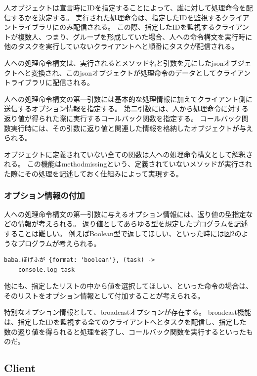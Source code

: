 人オブジェクトは宣言時にIDを指定することによって、誰に対して処理命令を配信するかを決定する。
実行された処理命令は、指定したIDを監視するクライアントライブラリにのみ配信される。
この際、指定したIDを監視するクライアントが複数人、つまり、グループを形成していた場合、人への命令構文を実行時に他のタスクを実行していないクライアントへと順番にタスクが配信される。

人への処理命令構文は、実行されるとメソッド名と引数を元にしたjsonオブジェクトへと変換され、このjsonオブジェクトが処理命令のデータとしてクライアントライブラリに配信される。

人への処理命令構文の第一引数には基本的な処理情報に加えてクライアント側に送信するオプション情報を指定する。
第二引数には、人から処理命令に対する返り値が得られた際に実行するコールバック関数を指定する。
コールバック関数実行時には、その引数に返り値と関連した情報を格納したオブジェクトが与えられる。

オブジェクトに定義されていない全ての関数は人への処理命令構文として解釈される。
この機能はmethodmissingという、定義されていないメソッドが実行された際にその処理を記述しておく仕組みによって実現する。

\subsubsection{オプション情報の付加}\label{ux30aaux30d7ux30b7ux30e7ux30f3ux60c5ux5831ux306eux4ed8ux52a0}

人への処理命令構文の第一引数に与えるオプション情報には、返り値の型指定などの情報が考えられる。
返り値としてあらゆる型を想定したプログラムを記述することは難しい。
例えばBoolean型で返してほしい、といった時には図2のようなプログラムが考えられる。

\begin{verbatim}
baba.ほげふが {format: 'boolean'}, (task) ->
    console.log task
\end{verbatim}

他にも、指定したリストの中から値を選択してほしい、といった命令の場合は、そのリストをオプション情報として付加することが考えられる。

特別なオプション情報として、broadcastオプションが存在する。
broadcast機能は、指定したIDを監視する全てのクライアントへとタスクを配信し、指定した数の返り値を得られると処理を終了し、コールバック関数を実行するといったものだ。

\subsection{Client}\label{client}

